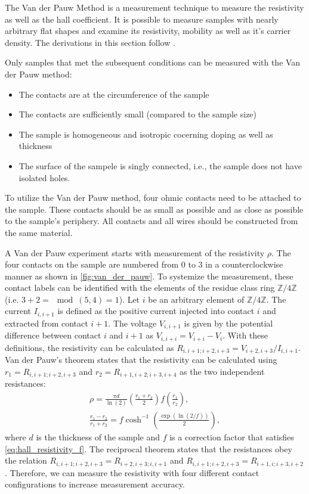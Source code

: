 The Van der Pauw Method is a measurement technique to measure the resistivity as well 
as the hall coefficient.
It is possible to measure samples with nearly arbitrary flat shapes and examine its 
resistivity, mobility as well as it's carrier density. 
The derivations in this section follow .

Only samples that met the subsequent conditions can be measured with the Van der Pauw 
method:
\begin{itemize}
	\item The contacts are at the circumference of the sample
	\item The contacts are sufficiently small (compared to the sample size)
	\item The sample is homogeneous and isotropic cocerning doping as well as thickness
	\item The surface of the sampele is singly connected, i.e., the sample does not 
	have isolated holes.
\end{itemize}
To utilize the Van der Pauw method, four ohmic contacts need to be attached to the 
sample.
These contacts should be as small as possible and as close as possible to the sample's 
periphery. 
All contacts and all wires should be constructed from the same material. 

A Van der Pauw experiment starts with measurement of the resistivity $\rho$.
The four contacts on the sample are numbered from \num{0} to \num{3} in a 
counterclockwise manner as shown in \cref{fig:van_der_pauw}. 
To systemize the measurement, these contact labels can be identified with the 
elements of the residue class ring $\mathbb{Z}/4\mathbb{Z}$ (i.e. $3+2=\mod(5,4)=1$).
Let $i$ be an arbitrary element of $\mathbb{Z}/4\mathbb{Z}$.
The current $I_{i, i+1}$ is defined as the positive current injected into contact $i$ 
and extracted from contact $i+1$.
The voltage $V_{i, i+1}$ is given by the potential difference between contact $i$ and 
$i+1$ as $V_{i, i+i}=V_{i+i}-V_i$. 
With these definitions, the resistivity can be calculated as 
$R_{i, i+1; i+2, i+3}=V_{i+2, i+3} / {I_{i, i+1}}$. 
Van der Pauw's theorem states that the resistivity can be calculated using 
$r_1=R_{i, i+1; i+2, i+3}$ and $r_2=R_{i+1, i+2; i+3, i+4}$ as the two independent 
resistances:
\begin{align}
	\rho=\frac{\pi d}{\ln(2)} \left( \frac{r_1+r_2}{2} \right)f
	\left( \frac{r_1}{r_2} \right), \label{eq:hall_resistivity}\\
	\frac{r_1-r_2}{r_1+r_2}=f \cosh^{-1} \left( \frac{\exp(\ln(2 /f))}{2} \right),
	\label{eq:hall_resistivity_f}
\end{align}
where $d$ is the thickness of the sample and $f$ is a correction factor that satisfies 
\cref{eq:hall_resistivity_f}. 
The reciprocal theorem states that the resistances obey the relation 
$R_{i, i+1; i+2, i+3}=R_{i+2, i+3; i, i+1}$ and 
$R_{i, i+1;i+2, i+3}=R_{i+1, i; i+3, i+2}$.
Therefore, we can measure the resistivity with four different contact configurations to 
increase measurement accuracy.

